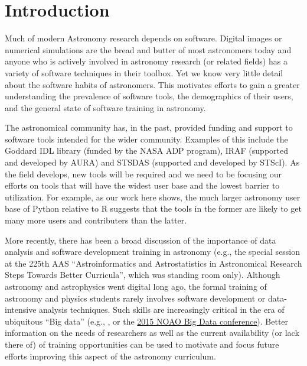 \section{Introduction}
\label{sec:intro}

Much of modern Astronomy research depends on software. Digital images or numerical simulations are the bread and butter of most astronomers today and anyone who is actively involved in astronomy research (or related fields) has a variety of software techniques in their toolbox. Yet we know very little detail about the software habits of astronomers. This motivates efforts to gain a greater understanding the prevalence of software tools, the demographics of their users, and the general state of software training in astronomy.

The astronomical community has, in the past, provided funding and support to software tools intended for the wider community. Examples of this include the Goddard IDL library (funded by the NASA ADP program), IRAF (supported and developed by AURA) and STSDAS (supported and developed by STScI). As the field develops, new tools will be required and we need to be focusing our efforts on tools that will have the widest user base and the lowest barrier to utilization. For example, as our work here shows, the much larger astronomy user base of Python relative to R suggests that the tools in the former are likely to get many more users and contributers than the latter. 

More recently, there has been a broad discussion of the importance of data analysis and software development training in astronomy (e.g., the special session at the 225th AAS ``Astroinformatics and Astrostatistics in Astronomical Research Steps Towards Better Curricula'', which was standing room only). Although astronomy and astrophysics went digital long ago, the formal training of astronomy and physics students rarely involves software development or data-intensive analysis techniques. Such skills are increasingly critical in the era of ubiquitous ``Big data'' (e.g., \cite{Berriman_2011}, or the \href{http://www.noao.edu/meetings/bigdata/}{2015 NOAO Big Data conference}). Better information on the needs of researchers as well as the current availability (or lack there of) of training opportunities can be used to motivate and focus future efforts improving this aspect of the astronomy curriculum. 

